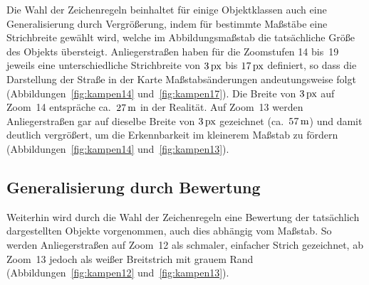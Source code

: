 \documentclass[../main/thesis.tex]{subfiles}
\begin{document}
Die Wahl der Zeichenregeln beinhaltet für einige Objektklassen auch eine Generalisierung durch Vergrößerung, indem für bestimmte Maßstäbe eine Strichbreite gewählt wird, welche im Abbildungsmaßstab die tatsächliche Größe des Objekts übersteigt.
Anliegerstraßen haben für die Zoomstufen 14 bis~19 jeweils eine unterschiedliche Strichbreite von $\unit[3]{px}$ bis $\unit[17]{px}$ definiert, so dass die Darstellung der Straße in der Karte Maßstabsänderungen andeutungsweise folgt (Abbildungen~\ref{fig:kampen14} und~\ref{fig:kampen17}). 
Die Breite von $\unit[3]{px}$ auf Zoom~14 entspräche ca.~$\unit[27]{m}$ in der Realität. 
Auf Zoom~13 werden Anliegerstraßen gar auf dieselbe Breite von $\unit[3]{px}$ gezeichnet (ca.~$\unit[57]{m}$) und damit deutlich vergrößert, um die Erkennbarkeit im kleinerem Maßstab zu fördern (Abbildungen~\ref{fig:kampen14} und~\ref{fig:kampen13}).




\subsection{Generalisierung durch Bewertung}

Weiterhin wird durch die Wahl der Zeichenregeln eine Bewertung der tatsächlich dargestellten Objekte vorgenommen, auch dies abhängig vom Maßstab.
So werden Anliegerstraßen auf Zoom~12 als schmaler, einfacher Strich gezeichnet, ab Zoom~13 jedoch als weißer Breitstrich mit grauem Rand (Abbildungen~\ref{fig:kampen12} und~\ref{fig:kampen13}).



\label{dual-highway-case-1}
\end{document}
